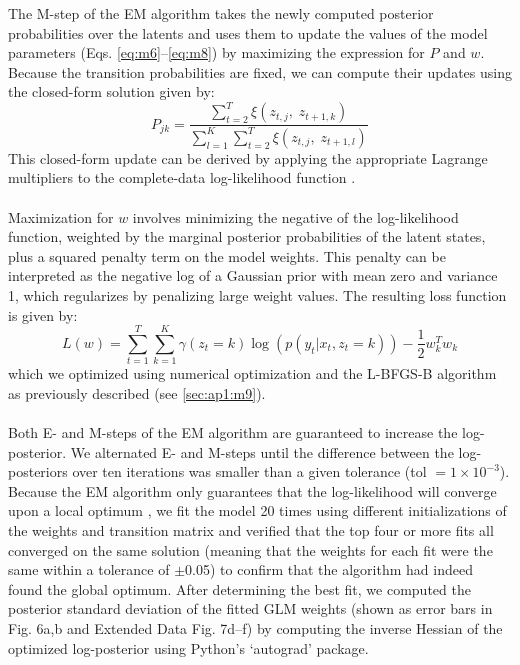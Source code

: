 The M-step of the EM algorithm takes the newly computed posterior probabilities over the latents and uses them to update the values of the model parameters (Eqs. \ref{eq:m6}–\ref{eq:m8}) by maximizing the expression for $P$ and $w$. Because the transition probabilities are fixed, we can compute their updates using the closed-form solution given by: 
\begin{equation}
\label{eq:m14}
    P_{jk} = \frac{{\mathop {\sum }\nolimits_{t = 2}^T \xi (z_{t,j},\;z_{t + 1,k})}}{{\mathop {\sum }\nolimits_{l = 1}^K \mathop {\sum }\nolimits_{t = 2}^T \xi (z_{t,j},\;z_{t + 1,l})}}
\end{equation}
This closed-form update can be derived by applying the appropriate Lagrange multipliers to the complete-data log-likelihood function \cite{bishop_pattern_2006}. \\\\
Maximization for $w$ involves minimizing the negative of the log-likelihood function, weighted by the marginal posterior probabilities of the latent states, plus a squared penalty term on the model weights. This penalty can be interpreted as the negative log of a Gaussian prior with mean zero and variance 1, which regularizes by penalizing large weight values. The resulting loss function is given by: 
\begin{equation}
\label{eq:m15}
    L(w) = \mathop {\sum}\limits_{t = 1}^T {\mathop {\sum}\limits_{k = 1}^K \gamma } (z_t = k)\log \left( {p\left( {y_t|x_t,z_t = k} \right)} \right) - \frac{1}{2}w_k^Tw_k
\end{equation}
which we optimized using numerical optimization and the L-BFGS-B algorithm as previously described (see \ref{sec:ap1:m9}). \\\\
Both E- and M-steps of the EM algorithm are guaranteed to increase the log-posterior. We alternated E- and M-steps until the difference between the log-posteriors over ten iterations was smaller than a given tolerance (tol $ =1 \times 10^{-3}$). Because the EM algorithm only guarantees that the log-likelihood will converge upon a local optimum \cite{bishop_pattern_2006}, we fit the model 20 times using different initializations of the weights and transition matrix and verified that the top four or more fits all converged on the same solution (meaning that the weights for each fit were the same within a tolerance of $\pm$0.05) to confirm that the algorithm had indeed found the global optimum. After determining the best fit, we computed the posterior standard deviation of the fitted GLM weights (shown as error bars in Fig. 6a,b and Extended Data Fig. 7d–f) by computing the inverse Hessian of the optimized log-posterior using Python’s `autograd' package. \\ \\
